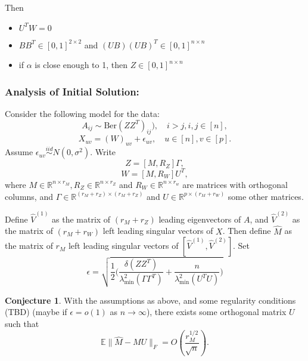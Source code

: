 \documentclass[notheorems]{beamer}
\theoremstyle{definition}
\newtheorem{conj}[definition]{Conjecture}
\newcommand{\al}{\alpha}
\newcommand{\Gam}{\Gamma}
\newcommand{\del}{\delta}
\newcommand{\lam}{\lambda}
\newcommand{\ep}{\epsilon}
\newcommand{\R}{\mathbb{R}}
\begin{document}
\begin{frame}
Then
\begin{itemize}
    \item $U^TW = 0$
    \item $BB^T \in [0,1]^{2 \times 2}$ and $(UB)(UB)^T \in [0,1]^{n \times n}$
    \item if $\al$ is close enough to 1, then $Z \in  [0,1]^{n \times n}$
    \end{itemize}

\end{frame}















\begin{frame}
\frametitle{Analysis of Initial Solution:} 
Consider the following model for the data:
$$A_{ij}\sim \text{Ber}(ZZ^T)_{ij}), \quad i>j,i,j\in[n],$$
$$X_{uv}= (W)_{uv} + \epsilon_{uv}, \quad u\in[n], v \in [p].$$
Assume $\epsilon_{uv} \overset{iid}{\sim} N(0, \sigma^2)$. Write 
$$Z = [M, R_Z] \Gamma,$$
$$W = [M, R_W] U^T,$$
where $M\in\R^{n\times r_M}, R_Z\in\R^{n\times r_Z}$ and $R_W\in\R^{n\times r_w}$ are matrices with orthogonal columns, and $\Gamma\in\R^{(r_M + r_Z)\times (r_M + r_Z)}$ and $U\in\R^{p\times (r_M + r_W)}$ some other matrices.

\end{frame}






\begin{frame}

Define $\hat{V}^{(1)}$ as the matrix of $(r_M + r_Z)$ leading eigenvectors of $A$, and $\hat{V}^{(2)}$ as the matrix of $(r_M + r_W)$ left leading singular vectors of $X$. Then define $\hat{M}$ as the matrix of $r_M$ left leading singular vectors of $[\hat{V}^{(1)}, \hat{V}^{(2)}]$. Set $$\epsilon = \sqrt{\frac{1}{2}\bigg(\frac{\del(ZZ^T)}{\lam^2_{\min}(\Gam \Gam^T)} + \frac{n}{\lam^2_{\min}(U^TU)}  \bigg)}$$

\begin{conj}
With the assumptions as above, and some regularity conditions (TBD) (maybe if $\ep = o(1)$ as $n \rightarrow \infty$), there exists some orthogonal matrix $U$ such that
$$\mathbb{E}\|\hat{M} - MU\|_F = O\left(\frac{r_M^{1/2}}{\sqrt{n}}\right).$$
\end{conj}
\end{frame}
\end{document}
